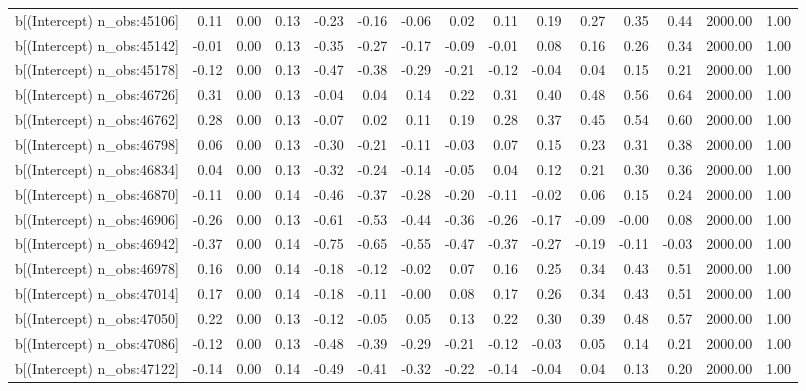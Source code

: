 \begin{table}[ht]
\begin{tabular}{rrrrrrrrrrrrrrr}
  b[(Intercept) n\_obs:45106] & 0.11 & 0.00 & 0.13 & -0.23 & -0.16 & -0.06 & 0.02 & 0.11 & 0.19 & 0.27 & 0.35 & 0.44 & 2000.00 & 1.00 \\ 
  b[(Intercept) n\_obs:45142] & -0.01 & 0.00 & 0.13 & -0.35 & -0.27 & -0.17 & -0.09 & -0.01 & 0.08 & 0.16 & 0.26 & 0.34 & 2000.00 & 1.00 \\ 
  b[(Intercept) n\_obs:45178] & -0.12 & 0.00 & 0.13 & -0.47 & -0.38 & -0.29 & -0.21 & -0.12 & -0.04 & 0.04 & 0.15 & 0.21 & 2000.00 & 1.00 \\ 
  b[(Intercept) n\_obs:46726] & 0.31 & 0.00 & 0.13 & -0.04 & 0.04 & 0.14 & 0.22 & 0.31 & 0.40 & 0.48 & 0.56 & 0.64 & 2000.00 & 1.00 \\ 
  b[(Intercept) n\_obs:46762] & 0.28 & 0.00 & 0.13 & -0.07 & 0.02 & 0.11 & 0.19 & 0.28 & 0.37 & 0.45 & 0.54 & 0.60 & 2000.00 & 1.00 \\ 
  b[(Intercept) n\_obs:46798] & 0.06 & 0.00 & 0.13 & -0.30 & -0.21 & -0.11 & -0.03 & 0.07 & 0.15 & 0.23 & 0.31 & 0.38 & 2000.00 & 1.00 \\ 
  b[(Intercept) n\_obs:46834] & 0.04 & 0.00 & 0.13 & -0.32 & -0.24 & -0.14 & -0.05 & 0.04 & 0.12 & 0.21 & 0.30 & 0.36 & 2000.00 & 1.00 \\ 
  b[(Intercept) n\_obs:46870] & -0.11 & 0.00 & 0.14 & -0.46 & -0.37 & -0.28 & -0.20 & -0.11 & -0.02 & 0.06 & 0.15 & 0.24 & 2000.00 & 1.00 \\ 
  b[(Intercept) n\_obs:46906] & -0.26 & 0.00 & 0.13 & -0.61 & -0.53 & -0.44 & -0.36 & -0.26 & -0.17 & -0.09 & -0.00 & 0.08 & 2000.00 & 1.00 \\ 
  b[(Intercept) n\_obs:46942] & -0.37 & 0.00 & 0.14 & -0.75 & -0.65 & -0.55 & -0.47 & -0.37 & -0.27 & -0.19 & -0.11 & -0.03 & 2000.00 & 1.00 \\ 
  b[(Intercept) n\_obs:46978] & 0.16 & 0.00 & 0.14 & -0.18 & -0.12 & -0.02 & 0.07 & 0.16 & 0.25 & 0.34 & 0.43 & 0.51 & 2000.00 & 1.00 \\ 
  b[(Intercept) n\_obs:47014] & 0.17 & 0.00 & 0.14 & -0.18 & -0.11 & -0.00 & 0.08 & 0.17 & 0.26 & 0.34 & 0.43 & 0.51 & 2000.00 & 1.00 \\ 
  b[(Intercept) n\_obs:47050] & 0.22 & 0.00 & 0.13 & -0.12 & -0.05 & 0.05 & 0.13 & 0.22 & 0.30 & 0.39 & 0.48 & 0.57 & 2000.00 & 1.00 \\ 
  b[(Intercept) n\_obs:47086] & -0.12 & 0.00 & 0.13 & -0.48 & -0.39 & -0.29 & -0.21 & -0.12 & -0.03 & 0.05 & 0.14 & 0.21 & 2000.00 & 1.00 \\ 
  b[(Intercept) n\_obs:47122] & -0.14 & 0.00 & 0.14 & -0.49 & -0.41 & -0.32 & -0.22 & -0.14 & -0.04 & 0.04 & 0.13 & 0.20 & 2000.00 & 1.00 \\ 

\end{tabular}
\end{table}
